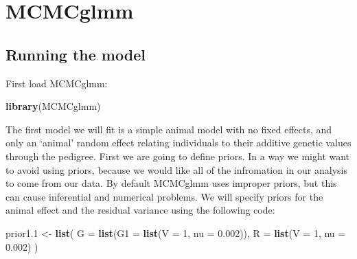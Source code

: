 \documentclass[12pt,]{book}
\newenvironment{Shaded}{\begin{snugshade}}{\end{snugshade}}
\newcommand{\DataTypeTok}[1]{\textcolor[rgb]{0.13,0.29,0.53}{#1}}
\newcommand{\DecValTok}[1]{\textcolor[rgb]{0.00,0.00,0.81}{#1}}
\newcommand{\FloatTok}[1]{\textcolor[rgb]{0.00,0.00,0.81}{#1}}
\newcommand{\KeywordTok}[1]{\textcolor[rgb]{0.13,0.29,0.53}{\textbf{#1}}}
\newcommand{\NormalTok}[1]{#1}
\newcommand{\StringTok}[1]{\textcolor[rgb]{0.31,0.60,0.02}{#1}}
\begin{document}
\hypertarget{mcmcglmm-1}{%
\section{MCMCglmm}\label{mcmcglmm-1}}

\hypertarget{running-the-model-1}{%
\subsection{Running the model}\label{running-the-model-1}}

First load MCMCglmm:

\begin{Shaded}
\begin{Highlighting}[]
\KeywordTok{library}\NormalTok{(MCMCglmm)}
\end{Highlighting}
\end{Shaded}

The first model we will fit is a simple animal model with no fixed effects, and only an `animal' random effect relating individuals to their additive genetic values through the pedigree. First we are going to define priors. In a way we might want to avoid using priors, because we would like all of the infromation in our analysis to come from our data. By default MCMCglmm uses improper priors, but this can cause inferential and numerical problems. We will specify priors for the animal effect and the residual variance using the following code:

\begin{Shaded}
\begin{Highlighting}[]
\NormalTok{prior1}\FloatTok{.1}\NormalTok{ <-}\StringTok{ }\KeywordTok{list}\NormalTok{(}
  \DataTypeTok{G =} \KeywordTok{list}\NormalTok{(}\DataTypeTok{G1 =} \KeywordTok{list}\NormalTok{(}\DataTypeTok{V =} \DecValTok{1}\NormalTok{, }\DataTypeTok{nu =} \FloatTok{0.002}\NormalTok{)),}
  \DataTypeTok{R =} \KeywordTok{list}\NormalTok{(}\DataTypeTok{V =} \DecValTok{1}\NormalTok{, }\DataTypeTok{nu =} \FloatTok{0.002}\NormalTok{)}
\NormalTok{)}
\end{Highlighting}
\end{Shaded}
\end{document}
